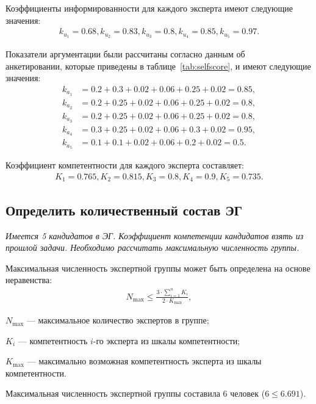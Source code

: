 Коэффициенты информированности для каждого эксперта имеют следующие значения:
\begin{align*}
	k_{u_1}=0.68, k_{u_2}=0.83, k_{u_3}=0.8, k_{u_4}=0.85, k_{u_5}=0.97.
\end{align*}

Показатели аргументации были рассчитаны согласно данным об \\ анкетировании, которые приведены в таблице~\ref{tab:selfscore}, и имеют следующие значения:
\begin{align*}
	k_{a_1} & = 0.2 + 0.3 + 0.02 + 0.06 + 0.25 + 0.02 = 0.85, \\
	k_{a_2} & = 0.2 + 0.25 + 0.02 + 0.06 + 0.25 + 0.02 = 0.8, \\
	k_{a_3} & = 0.2 + 0.25 + 0.02 + 0.06 + 0.25 + 0.02 = 0.8, \\
	k_{a_4} & = 0.3 + 0.25 + 0.02 + 0.06 + 0.3 + 0.02 = 0.95, \\
	k_{a_5} & = 0.1 + 0.1 + 0.02 + 0.06 + 0.2 + 0.02 = 0.5.
\end{align*}

Коэффициент компетентности для каждого эксперта составляет:
\begin{align*}
	K_1=0.765, K_2=0.815, K_3=0.8, K_4=0.9, K_5=0.735.
\end{align*}

\subsection{Определить количественный состав ЭГ}
{
	\itshape
	Имеется 5 кандидатов в ЭГ.
	Коэффициент компетенции кандидатов взять из прошлой задачи.
	Необходимо рассчитать максимальную численность группы.
}

Максимальная численность экспертной группы может быть определена на основе неравенства:
\begin{align*}
	N_{\max} \leq \frac{3 \cdot \sum_{i=1}^{n} K_i}{2 \cdot K_{\max}},
\end{align*}
\begin{description}
	\item[где] $N_{\max}$ --- максимальное количество экспертов в группе;
	\item $K_i$ --- компетентность $i$-го эксперта из шкалы компетентности;
	\item $K_{\max}$ --- максимально возможная компетентность эксперта из шкалы компетентности.
\end{description}

Максимальная численность экспертной группы составила 6 человек ($6 \leq 6.691$).

